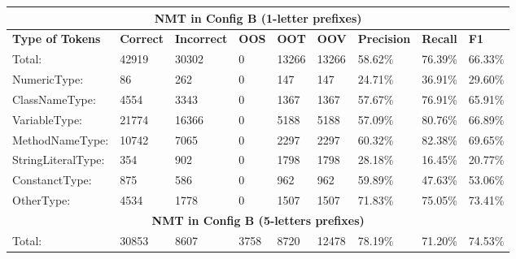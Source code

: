 \begin{table*}[]
\small
\begin{tabular}{|l|l|l|l|l|l|l|l|l|}
\hline
\multicolumn{9}{|c|}{\textbf{NMT in Config B (1-letter prefixes)}}                                                                                                \\ \hline
\textbf{Type of Tokens} & \textbf{Correct} & \textbf{Incorrect} & \textbf{OOS} & \textbf{OOT} & \textbf{OOV} & \textbf{Precision} & \textbf{Recall} & \textbf{F1} \\ \hline
Total:                  & 42919            & 30302              & 0            & 13266        & 13266        & 58.62\%            & 76.39\%         & 66.33\%     \\ \hline
NumericType:            & 86               & 262                & 0            & 147          & 147          & 24.71\%            & 36.91\%         & 29.60\%     \\ \hline
ClassNameType:          & 4554             & 3343               & 0            & 1367         & 1367         & 57.67\%            & 76.91\%         & 65.91\%     \\ \hline
VariableType:           & 21774            & 16366              & 0            & 5188         & 5188         & 57.09\%            & 80.76\%         & 66.89\%     \\ \hline
MethodNameType:         & 10742            & 7065               & 0            & 2297         & 2297         & 60.32\%            & 82.38\%         & 69.65\%     \\ \hline
StringLiteralType:      & 354              & 902                & 0            & 1798         & 1798         & 28.18\%            & 16.45\%         & 20.77\%     \\ \hline
ConstanctType:          & 875              & 586                & 0            & 962          & 962          & 59.89\%            & 47.63\%         & 53.06\%     \\ \hline
OtherType:              & 4534             & 1778               & 0            & 1507         & 1507         & 71.83\%            & 75.05\%         & 73.41\%     \\ \hline
\multicolumn{9}{|c|}{\textbf{NMT in Config B (5-letters prefixes)}}                                                                                               \\ \hline
Total:                  & 30853            & 8607               & 3758         & 8720         & 12478        & 78.19\%            & 71.20\%         & 74.53\%     \\ \hline

\end{tabular}
\end{table*}
